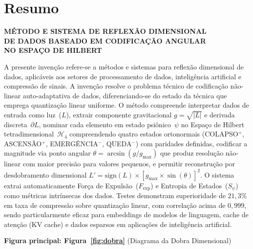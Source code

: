 \documentclass[12pt,a4paper]{article}
\newcommand{\Fexp}{F_{\text{exp}}}
\newcommand{\Hfour}{\mathcal{H}_4}
\begin{document}
\newpage
\section{Resumo}

\begin{center}
{\large\bfseries MÉTODO E SISTEMA DE REFLEXÃO DIMENSIONAL\\
DE DADOS BASEADO EM CODIFICAÇÃO ANGULAR\\
NO ESPAÇO DE HILBERT}
\end{center}

\vspace{0.5cm}

A presente invenção refere-se a métodos e sistemas para reflexão
dimensional de dados, aplicáveis aos setores de processamento de
dados, inteligência artificial e compressão de sinais. A
invenção resolve o problema técnico de codificação não-linear
auto-adaptativa de dados, diferenciando-se do estado da técnica
que emprega quantização linear uniforme. O método compreende
interpretar dados de entrada como luz~($L$), extrair componente
gravitacional $g = \sqrt{|L|}$ e derivada discreta~$\partial L$,
nominar cada elemento em estado psiônico~$\psi$ no Espaço de
Hilbert tetradimensional~$\Hfour$ compreendendo quatro estados
ortonormais (COLAPSO$^+$, ASCENSÃO$^+$, EMERGÊNCIA$^-$,
QUEDA$^-$) com paridades definidas, codificar a magnitude via
ponto angular $\theta = \arcsin(g/g_{\max})$ que produz
resolução não-linear com maior precisão para valores pequenos, e
permitir reconstrução por desdobramento dimensional
$L' = \text{sign}(L) \times [g_{\max} \times \sin(\theta)]^2$.
O sistema extrai automaticamente Força de Expulsão~($\Fexp$) e
Entropia de Estados~($S_\psi$) como métricas intrínsecas dos
dados. Testes demonstram superioridade de $21{,}3\%$ em taxa de
compressão sobre quantização linear, com correlação acima de
$0{,}999$, sendo particularmente eficaz para embeddings de
modelos de linguagem, cache de atenção (KV cache) e dados
esparsos em aplicações de inteligência artificial.

\vspace{0.5cm}
\textbf{Figura principal: Figura~\ref{fig:dobra}}
(Diagrama da Dobra Dimensional)
\end{document}
